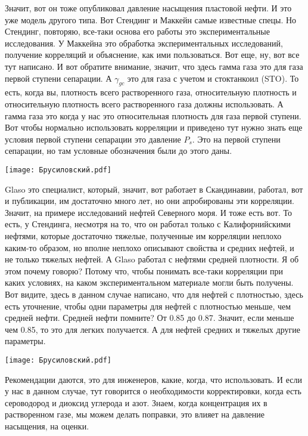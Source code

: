 \documentclass[main.tex]{subfiles}
\begin{document}
Значит, вот он тоже опубликовал давление насыщения пластовой нефти.
И это уже модель другого типа.
Вот Стендинг и Маккейн самые известные спецы.
Но Стендинг, повторяю, все-таки основа его работы это экспериментальные исследования.
У Маккейна это обработка экспериментальных исследований, получение корреляций и объяснение, как ими пользоваться. Вот еще, ну, вот все тут написано.
И вот обратите внимание, значит, что здесь гамма газа это для газа первой ступени сепарации.
А $\gamma_{gc}$ это для газа с учетом и стоктанкоил (STO).
То есть, когда вы, плотность всего растворенного газа, относительную плотность и относительную плотность всего растворенного газа должны использовать.
А гамма газа это когда у нас это относительная плотность для газа первой ступени.
Вот чтобы нормально использовать корреляции и приведено тут нужно знать еще условия первой ступени сепарации это давление $P_s$.
Это на первой ступени сепарации, но там условные обозначения были до этого даны.

\begin{center}
\texttt{[image: Брусиловский.pdf]}
\end{center}

Glaso это специалист, который, значит, вот работает в Скандинавии, работал, вот и публикации, им достаточно много лет, но они апробированы эти корреляции.
Значит, на примере исследований нефтей Северного моря.
И тоже есть вот.
То есть, у Стендинга, несмотря на то, что он работал только с Калифорнийскими нефтями, которые достаточно тяжелые, полученные им корреляции неплохо каким-то образом, но вполне неплохо описывают свойства и средних нефтей, и не только тяжелых нефтей.
А Glaso работал с нефтями средней плотности.
Я об этом почему говорю?
Потому что, чтобы понимать все-таки корреляции при каких условиях, на каком экспериментальном материале могли быть получены.
Вот видите, здесь в данном случае написано, что для нефтей с плотностью, здесь есть уточнение, чтобы одни параметры для нефтей с плотностью меньше, чем средней нефти.
Средней нефти помните?
От 0.85 до 0.87.
Значит, если меньше чем 0.85, то это для легких получается.
А для нефтей средних и тяжелых другие параметры.

\begin{center}
\texttt{[image: Брусиловский.pdf]}
\end{center}

Рекомендации даются, это для инженеров, какие, когда, что использовать.
И если у нас в данном случае, тут говорится о необходимости корректировки, когда есть сероводород и диоксид углерода и азот.
Знаем, когда концентрация их в растворенном газе, мы можем делать поправки, это влияет на давление насыщения, на оценки.
\end{document}
